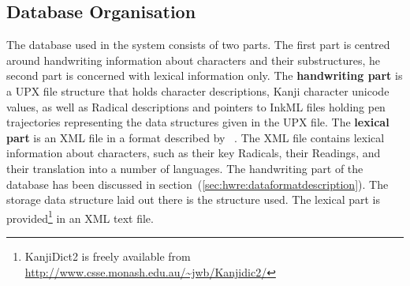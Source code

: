 



\subsection{Database Organisation}
\label{sec:hwre:databaseorganisation}

The database used in the system consists of two parts. The first part is centred
around handwriting information about characters and their substructures, 
he second part is concerned with lexical information only.
The \textbf{handwriting part} is a UPX file structure that holds character 
descriptions, Kanji character unicode values, as well as Radical descriptions 
and pointers to InkML files holding pen trajectories representing the
data structures given in the UPX file.
The \textbf{lexical part} is an XML file in a format described 
by~ \citeyear{Breen2004}. The XML file contains 
lexical information about characters, such as their key Radicals, their Readings,
and their translation into a number of languages.
The handwriting part of the database has been discussed in 
section~(\ref{sec:hwre:dataformatdescription}). The storage data structure laid
out there is the structure used.
The lexical part is provided\footnote{KanjiDict2 is freely available from \url{http://www.csse.monash.edu.au/~jwb/Kanjidic2/}} in an XML text file.

